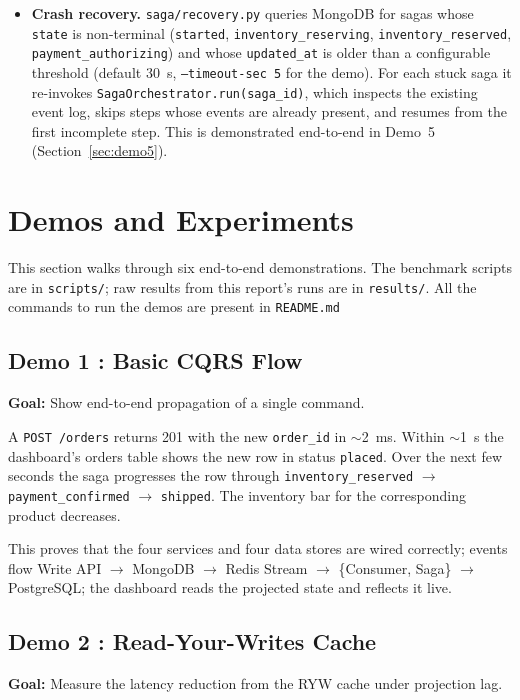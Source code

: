 \documentclass[11pt,a4paper]{article}
\newcommand{\code}[1]{\texttt{\small #1}}
\newcommand{\file}[1]{\textcolor{primary}{\texttt{\small #1}}}
\begin{document}
\begin{itemize}
  \item \textbf{Crash recovery.}
  \file{saga/recovery.py} queries MongoDB for sagas whose \code{state} is
  non-terminal (\code{started}, \code{inventory\_reserving}, \code{inventory\_reserved},
  \code{payment\_authorizing}) and whose \code{updated\_at} is older than a
  configurable threshold (default 30~s, \code{--timeout-sec 5} for the demo).
  For each stuck saga it re-invokes \code{SagaOrchestrator.run(saga\_id)}, which
  inspects the existing event log, skips steps whose events are already present,
  and resumes from the first incomplete step.
  This is demonstrated end-to-end in Demo~5 (Section~\ref{sec:demo5}).

\end{itemize}
\section{Demos and Experiments}

This section walks through six end-to-end demonstrations. The benchmark scripts are in \file{scripts/}; raw results from this report's runs are in \file{results/}. All the commands to run the demos are present in \file{README.md}

\subsection{Demo 1 : Basic CQRS Flow}

\textbf{Goal:} Show end-to-end propagation of a single command.

A \code{POST /orders} returns 201 with the new \code{order\_id} in $\sim$2~ms. Within $\sim$1~s the dashboard's orders table shows the new row in status \code{placed}. Over the next few seconds the saga progresses the row through \code{inventory\_reserved} $\to$ \code{payment\_confirmed} $\to$ \code{shipped}. The inventory bar for the corresponding product decreases.

This proves that the four services and four data stores are wired correctly; events flow Write API $\to$ MongoDB $\to$ Redis Stream $\to$ \{Consumer, Saga\} $\to$ PostgreSQL; the dashboard reads the projected state and reflects it live.

\subsection{Demo 2 : Read-Your-Writes Cache}\label{sec:demo2}
\textbf{Goal:} Measure the latency reduction from the RYW cache under projection lag.
\end{document}
